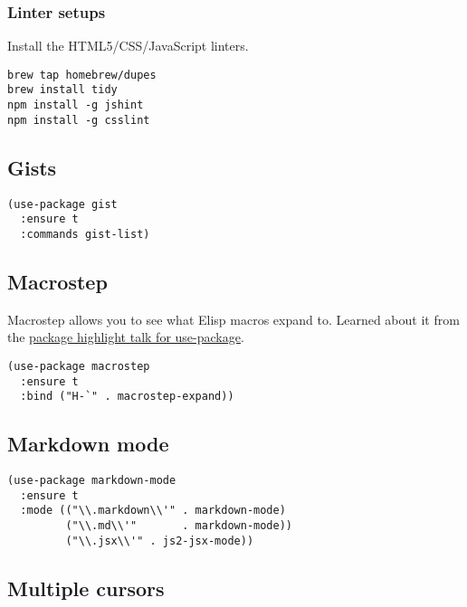 \documentclass[11pt]{article}
\begin{document}
\subsubsection{Linter setups}
\label{sec-18-16-1}

Install the HTML5/CSS/JavaScript linters.

\begin{verbatim}
brew tap homebrew/dupes
brew install tidy
npm install -g jshint
npm install -g csslint
\end{verbatim}

\subsection{Gists}
\label{sec-18-17}

\begin{verbatim}
(use-package gist
  :ensure t
  :commands gist-list)
\end{verbatim}

\subsection{Macrostep}
\label{sec-18-18}

Macrostep allows you to see what Elisp macros expand to. Learned about
it from the \href{https://www.youtube.com/watch?v\%3D2TSKxxYEbII}{package highlight talk for use-package}.

\begin{verbatim}
(use-package macrostep
  :ensure t
  :bind ("H-`" . macrostep-expand))
\end{verbatim}

\subsection{Markdown mode}
\label{sec-18-19}

\begin{verbatim}
(use-package markdown-mode
  :ensure t
  :mode (("\\.markdown\\'" . markdown-mode)
         ("\\.md\\'"       . markdown-mode))
         ("\\.jsx\\'" . js2-jsx-mode))
\end{verbatim}

\subsection{Multiple cursors}
\label{sec-18-20}
\end{document}
